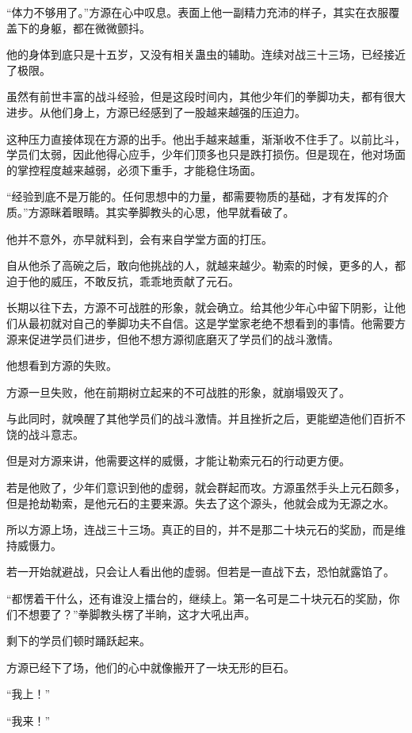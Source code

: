 \begin{this_body}
“体力不够用了。”方源在心中叹息。表面上他一副精力充沛的样子，其实在衣服覆盖下的身躯，都在微微颤抖。

他的身体到底只是十五岁，又没有相关蛊虫的辅助。连续对战三十三场，已经接近了极限。

虽然有前世丰富的战斗经验，但是这段时间内，其他少年们的拳脚功夫，都有很大进步。从他们身上，方源已经感到了一股越来越强的压迫力。

这种压力直接体现在方源的出手。他出手越来越重，渐渐收不住手了。以前比斗，学员们太弱，因此他得心应手，少年们顶多也只是跌打损伤。但是现在，他对场面的掌控程度越来越弱，必须下重手，才能稳住场面。

“经验到底不是万能的。任何思想中的力量，都需要物质的基础，才有发挥的介质。”方源眯着眼睛。其实拳脚教头的心思，他早就看破了。

他并不意外，亦早就料到，会有来自学堂方面的打压。

自从他杀了高碗之后，敢向他挑战的人，就越来越少。勒索的时候，更多的人，都迫于他的威压，不敢反抗，乖乖地贡献了元石。

长期以往下去，方源不可战胜的形象，就会确立。给其他少年心中留下阴影，让他们从最初就对自己的拳脚功夫不自信。这是学堂家老绝不想看到的事情。他需要方源来促进学员们进步，但他不想方源彻底磨灭了学员们的战斗激情。

他想看到方源的失败。

方源一旦失败，他在前期树立起来的不可战胜的形象，就崩塌毁灭了。

与此同时，就唤醒了其他学员们的战斗激情。并且挫折之后，更能塑造他们百折不饶的战斗意志。

但是对方源来讲，他需要这样的威慑，才能让勒索元石的行动更方便。

若是他败了，少年们意识到他的虚弱，就会群起而攻。方源虽然手头上元石颇多，但是抢劫勒索，是他元石的主要来源。失去了这个源头，他就会成为无源之水。

所以方源上场，连战三十三场。真正的目的，并不是那二十块元石的奖励，而是维持威慑力。

若一开始就避战，只会让人看出他的虚弱。但若是一直战下去，恐怕就露馅了。

“都愣着干什么，还有谁没上擂台的，继续上。第一名可是二十块元石的奖励，你们不想要了？”拳脚教头楞了半晌，这才大吼出声。

剩下的学员们顿时踊跃起来。

方源已经下了场，他们的心中就像搬开了一块无形的巨石。

“我上！”

“我来！”


\end{this_body}
